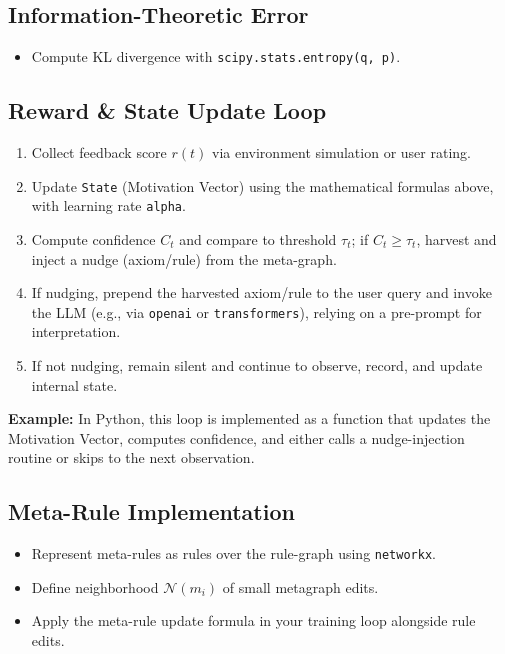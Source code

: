 \documentclass[11pt]{article}
\begin{document}
\subsection{Information-Theoretic Error}
\begin{itemize}
  \item Compute KL divergence with \texttt{scipy.stats.entropy(q, p)}.
\end{itemize}

\subsection{Reward \& State Update Loop}
\begin{enumerate}
  \item Collect feedback score $r(t)$ via environment simulation or user rating.
  \item Update \texttt{State} (Motivation Vector) using the mathematical formulas above, with learning rate \texttt{alpha}.
  \item Compute confidence $C_t$ and compare to threshold $\tau_t$; if $C_t \geq \tau_t$, harvest and inject a nudge (axiom/rule) from the meta-graph.
  \item If nudging, prepend the harvested axiom/rule to the user query and invoke the LLM (e.g., via \texttt{openai} or \texttt{transformers}), relying on a pre-prompt for interpretation.
  \item If not nudging, remain silent and continue to observe, record, and update internal state.
\end{enumerate}
\textbf{Example:} In Python, this loop is implemented as a function that updates the Motivation Vector, computes confidence, and either calls a nudge-injection routine or skips to the next observation.

\subsection{Meta-Rule Implementation}
\begin{itemize}
  \item Represent meta-rules as rules over the rule-graph using \texttt{networkx}.
  \item Define neighborhood $\mathcal{N}(m_i)$ of small metagraph edits.
  \item Apply the meta-rule update formula in your training loop alongside rule edits.
\end{itemize}
\end{document}
